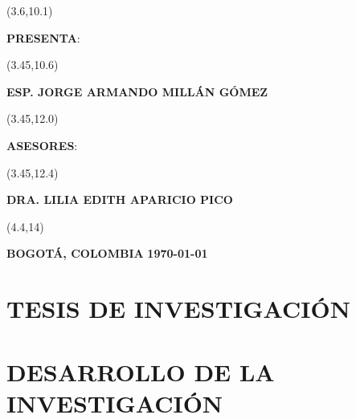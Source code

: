 \documentclass[openany,12pt,letterpaper]{book}
\begin{document}
	\begin{textblock}{12}(3.6,10.1)
		\begin{center} \textbf{PRESENTA}: \end{center}
	\end{textblock}
	
	\begin{textblock}{12}(3.45,10.6)
		\begin{center} \Large{\textbf{ESP. JORGE ARMANDO MILLÁN GÓMEZ}} \end{center}
	\end{textblock}
	
	\begin{textblock}{12}(3.45,12.0)
		\begin{center} \textbf{ASESORES}: \end{center}
	\end{textblock}
	
	\begin{textblock}{12}(3.45,12.4)
		\begin{center} 
			\large{\textbf{DRA. LILIA EDITH APARICIO PICO}} 
		\end{center}
	\end{textblock}
	
	\begin{textblock}{9.5}(4.4,14)
		\begin{center} \textbf{BOGOTÁ, COLOMBIA}\hspace{1in} \textbf{\today} \end{center}
	\end{textblock}
	\newpage

	
	\clearpage
	\tableofcontents
	\listoffigures
	\listoftables
	\lstlistoflistings	
	\part{TESIS DE INVESTIGACIÓN}
	
	
	
	
	\clearpage
	
	\part{DESARROLLO DE LA INVESTIGACIÓN}
	
	
\end{document}
